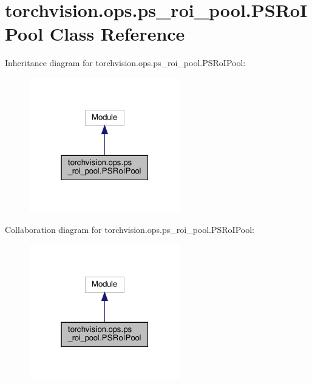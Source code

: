 \hypertarget{classtorchvision_1_1ops_1_1ps__roi__pool_1_1PSRoIPool}{}\section{torchvision.\+ops.\+ps\+\_\+roi\+\_\+pool.\+P\+S\+Ro\+I\+Pool Class Reference}
\label{classtorchvision_1_1ops_1_1ps__roi__pool_1_1PSRoIPool}


Inheritance diagram for torchvision.\+ops.\+ps\+\_\+roi\+\_\+pool.\+P\+S\+Ro\+I\+Pool\+:
\nopagebreak
\begin{figure}[H]
\begin{center}
\leavevmode
\includegraphics[width=187pt]{classtorchvision_1_1ops_1_1ps__roi__pool_1_1PSRoIPool__inherit__graph}
\end{center}
\end{figure}


Collaboration diagram for torchvision.\+ops.\+ps\+\_\+roi\+\_\+pool.\+P\+S\+Ro\+I\+Pool\+:
\nopagebreak
\begin{figure}[H]
\begin{center}
\leavevmode
\includegraphics[width=187pt]{classtorchvision_1_1ops_1_1ps__roi__pool_1_1PSRoIPool__coll__graph}
\end{center}
\end{figure}
